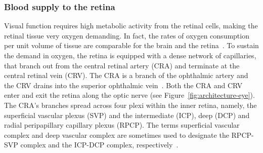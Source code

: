 \documentclass{article}
\begin{document}
\subsubsection{Blood supply to the retina}\label{sec:BloodSupplyRetina}

Visual function requires high metabolic activity from the retinal cells, making the retinal tissue very oxygen demanding.
In fact, the rates of oxygen consumption per unit volume of tissue are comparable for the brain and the retina~\cite{Medrano_1995}.
To sustain the demand in oxygen, the retina is equipped with a dense network of capillaries, that branch out from the central retinal artery (CRA) and terminate at the central retinal vein (CRV).
The CRA is a branch of the ophthalmic artery and the CRV drains into the superior ophthalmic vein~\cite{Kiel_2011}.
Both the CRA and CRV enter and exit the retina along the optic nerve (see Figure~\ref{fig:architecture-eye}).
The CRA's branches spread across four plexi within the inner retina, namely, the superficial vascular plexus (SVP) and the intermediate (ICP), deep (DCP) and radial peripapillary capillary plexus (RPCP).
The terms superficial vascular complex and deep vascular complex are sometimes used to designate the RPCP-SVP complex and the ICP-DCP complex, respectively~\cite{Campbell_2017}.
\end{document}
